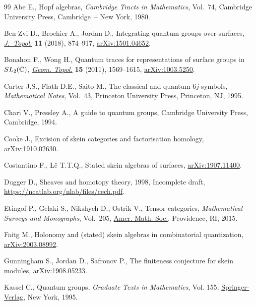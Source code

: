 \documentclass[11pt]{article}
\numberwithin{equation}{section}
\numberwithin{equation}{section}
\begin{document}
\begin{thebibliography}{99}
Abe E., Hopf algebras, \textit{Cambridge Tracts in Mathematics}, Vol.~74,
 Cambridge University Press, Cambridge~-- New York, 1980.

Ben-Zvi D., Brochier A., Jordan D., Integrating quantum groups over surfaces,
 \href{https://doi.org/10.1112/topo.12072}{\textit{J.~Topol.}} \textbf{11} (2018), 874--917, \href{http://arxiv.org/abs/1501.04652}{arXiv:1501.04652}.

Bonahon F., Wong H., Quantum traces for representations of surface groups in
 {${\rm SL}_2(\mathbb C)$}, \href{https://doi.org/10.2140/gt.2011.15.1569}{\textit{Geom. Topol.}} \textbf{15} (2011),
 1569--1615, \href{http://arxiv.org/abs/1003.5250}{arXiv:1003.5250}.

Carter J.S., Flath D.E., Saito M., The classical and quantum 6{$j$}-symbols,
 \textit{Mathematical Notes}, Vol.~43, Princeton University Press, Princeton,
 NJ, 1995.

Chari V., Pressley A., A guide to quantum groups, Cambridge University Press,
 Cambridge, 1994.

Cooke J., Excision of skein categories and factorisation homology,
 \href{http://arxiv.org/abs/1910.02630}{arXiv:1910.02630}.

Costantino F., L\^e T.T.Q., Stated skein algebras of surfaces,
 \href{http://arxiv.org/abs/1907.11400}{arXiv:1907.11400}.

Dugger D., Sheaves and homotopy theory, 1998, {I}ncomplete draft,
 \url{https://ncatlab.org/nlab/files/cech.pdf}.

Etingof P., Gelaki S., Nikshych D., Ostrik V., Tensor categories,
 \textit{Mathematical Surveys and Monographs}, Vol.~205, \href{https://doi.org/10.1090/surv/205}{Amer. Math. Soc.},
 Providence, RI, 2015.

Faitg M., Holonomy and (stated) skein algebras in combinatorial quantization,
 \href{http://arxiv.org/abs/2003.08992}{arXiv:2003.08992}.

Gunningham S., Jordan D., Safronov P., The finiteness conjecture for skein
 modules, \href{http://arxiv.org/abs/1908.05233}{arXiv:1908.05233}.

Kassel C., Quantum groups, \textit{Graduate Texts in Mathematics}, Vol. 155,
 \href{https://doi.org/10.1007/978-1-4612-0783-2}{Springer-Verlag}, New York, 1995.


\end{thebibliography}
\end{document}
